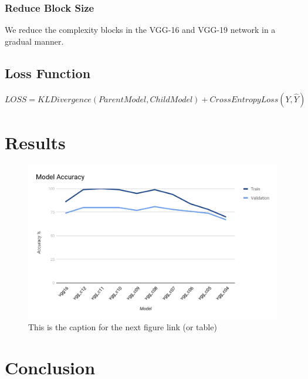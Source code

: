 \documentclass[a4paper,twocolumn]{article}
\begin{document}
\subsubsection*{Reduce Block Size}
\label{sec-4-2-2}
We reduce the complexity blocks in the VGG-16 and VGG-19 network in a gradual manner.


\subsection{Loss Function}
\label{sec-4-3}

$LOSS = KLDivergence(ParentModel, ChildModel) + CrossEntropyLoss(Y, \hat{Y})$


\section{Results}
\label{sec-5}

\begin{figure}[htb]
\centering
\includegraphics[width=.9\linewidth]{./media/vgg16-cifar10/vgg16_cifar10_Acc.png}
\caption{\label{fig:SED-HR4049}This is the caption for the next figure link (or table)}
\end{figure}

\section{Conclusion}
\label{sec-6}


\printbibliography
\end{document}
